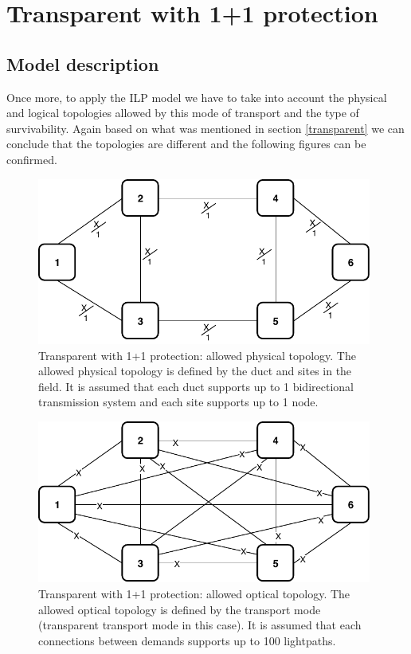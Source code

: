 \clearpage

\section{Transparent with 1+1 protection}\label{ILP_Transp_Protection}

\subsection{Model description}

Once more, to apply the ILP model we have to take into account the physical and logical topologies allowed by this mode of transport and the type of survivability. Again based on what was mentioned in section \ref{transparent} we can conclude that the topologies are different and the following figures can be confirmed.\\

\begin{figure}[h!]
\centering
\includegraphics[width=11cm]{sdf/ilp/transparent_protection/figures/allowed_physical_topology}
\caption{Transparent with 1+1 protection: allowed physical topology. The allowed physical topology is defined by the duct and sites in the field. It is assumed that each duct supports up to 1 bidirectional transmission system and each site supports up to 1 node.}
\label{allowed2_physical_protectionlow}
\end{figure}

\vspace{15pt}
\begin{figure}[h!]
\centering
\includegraphics[width=11cm]{sdf/ilp/transparent_protection/figures/allowed_optical_topology}
\caption{Transparent with 1+1 protection: allowed optical topology. The allowed optical topology is defined by the transport mode (transparent transport mode in this case). It is assumed that each connections between demands supports up to 100 lightpaths.}
\label{allowed2_optical_protectionlow}
\end{figure}

